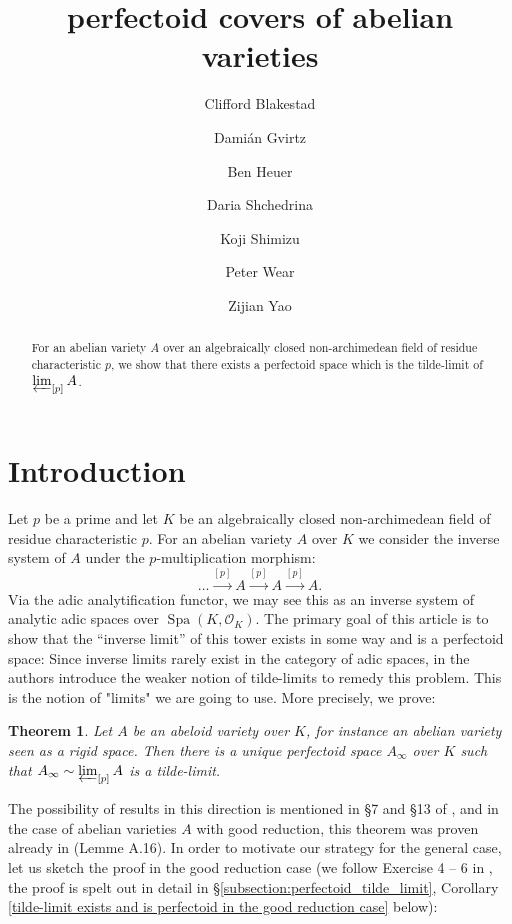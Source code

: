 \documentclass[10pt,oneside]{amsart}
\title[perfectoid covers of abelian varieties]{perfectoid  covers of abelian varieties}
\author{
	Clifford Blakestad \and
	Dami\'an Gvirtz \and
	Ben Heuer \and 
	Daria Shchedrina \and
	Koji Shimizu \and 
	Peter Wear \and
	Zijian Yao}
\newtheorem{mainthm}{Theorem}
\theoremstyle{definition}
\begin{document}
	
	\maketitle
	
	\begin{abstract}
For an abelian variety $A$ over an algebraically closed non-archimedean field of residue characteristic $p$, we show that there exists a perfectoid space which is the tilde-limit of $\varprojlim_{[p]}A$.
	\end{abstract}
	

	
	\section{Introduction} 

Let $p$ be a prime and let $K$ be an algebraically closed non-archimedean field of residue characteristic $p$.
For an abelian variety $A$ over $K$ we consider the inverse system of $A$ under the $p$-multiplication morphism:
\[\dots\xrightarrow{[p]}A\xrightarrow{[p]}A\xrightarrow{[p]}A.\]
Via the adic analytification functor, we may see this as an inverse system of analytic adic spaces over $\operatorname{Spa}(K,\mathcal O_K)$.
The primary goal of this article is to show that the ``inverse limit'' of this tower exists in some way and is a perfectoid space: Since inverse limits rarely exist in the category of adic spaces, in \cite{SW} the authors introduce the weaker notion of tilde-limits to remedy this problem. This is the notion of "limits" we are going to use. More precisely, we prove:

 


\begin{mainthm} \label{thm:main_thm_intro}
	Let $A$ be an abeloid variety over $K$, for instance an abelian variety seen as a rigid space. Then there is a unique perfectoid space $A_\infty$ over $K$ such that
	$A_\infty \sim \varprojlim_{[p]} A$ is a tilde-limit.
\end{mainthm}

The possibility of results in this direction is mentioned in \S 7 and \S 13 of \cite{scholzeICMproceedings}, and in the case of abelian varieties $A$ with good reduction, this theorem was proven already in \cite{Pilloni-Stroh} (Lemme A.16).  In order to motivate our strategy for the general case, let us sketch the proof in the good reduction case (we follow Exercise 4 -- 6 in \cite{Bhatt}, the proof is spelt out in detail in \S \ref{subsection:perfectoid_tilde_limit}, Corollary \ref{tilde-limit exists and is perfectoid in the good reduction case} below):
\end{document}
